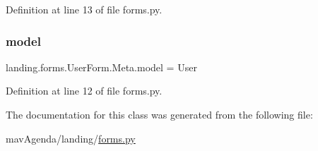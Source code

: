 Definition at line 13 of file forms.\+py.

\mbox{\label{classlanding_1_1forms_1_1UserForm_1_1Meta_ad36e35754db9ad189c731528a0ec160e}} 
\subsubsection{\texorpdfstring{model}{model}}
{\footnotesize\ttfamily landing.\+forms.\+User\+Form.\+Meta.\+model = User\hspace{0.3cm}{\ttfamily [static]}}



Definition at line 12 of file forms.\+py.



The documentation for this class was generated from the following file\+:\begin{DoxyCompactItemize}
\item 
mav\+Agenda/landing/\mbox{\hyperlink{forms_8py}{forms.\+py}}\end{DoxyCompactItemize}
